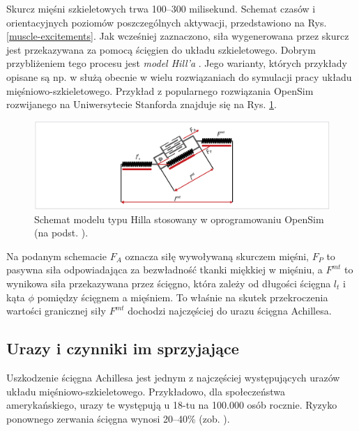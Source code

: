 Skurcz mięśni szkieletowych trwa 100--300 milisekund. Schemat czasów i orientacyjnych poziomów poszczególnych aktywacji, przedstawiono na Rys. \ref{muscle-excitements}. Jak wcześniej zaznaczono, siła wygenerowana przez skurcz jest przekazywana za pomocą ścięgien do układu szkieletowego. Dobrym przybliżeniem tego procesu jest \textit{model Hill'a} \cite{Hill1938}. Jego warianty, których przykłady opisane są np. w \cite{Perreault2003} służą obecnie w wielu rozwiązaniach do symulacji pracy układu mięśniowo-szkieletowego. Przykład z popularnego rozwiązania OpenSim rozwijanego na Uniwersytecie Stanforda znajduje się na Rys. \ref{hill-model}.
\begin{figure}[h!]
	\centering
	\includegraphics[width=1\textwidth]{figures/Hill.png}
	\caption{Schemat modelu typu Hilla stosowany w oprogramowaniu OpenSim (na podst. \cite{Romero2016}).}
	\label{hill-model}
\end{figure}

Na podanym schemacie $F_A$ oznacza siłę wywoływaną skurczem mięśni, $F_P$ \linebreak to pasywna siła odpowiadająca za bezwładność tkanki miękkiej w mięśniu, a $F^{mt}$ to wynikowa siła przekazywana przez ścięgno, która zależy od długości ścięgna $l_t$ \linebreak i kąta $\phi$ pomiędzy ścięgnem a mięśniem. To właśnie na skutek przekroczenia wartości granicznej siły $F^{mt}$ dochodzi najczęściej do urazu ścięgna Achillesa. 

\subsection{Urazy i czynniki im sprzyjające}
\label{seq:epidemiology}
Uszkodzenie ścięgna Achillesa jest jednym z najczęściej występujących urazów układu mięśniowo-szkieletowego. Przykładowo, dla społeczeństwa amerykańskiego, urazy te występują u 18-tu na 100.000 osób rocznie. Ryzyko ponownego zerwania ścięgna wynosi 20--40\% (zob. \cite{EpidemiologyUS}). 

